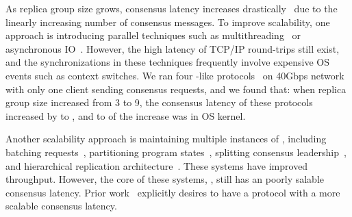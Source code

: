 
As replica group size grows, \paxos consensus latency increases
drastically~\cite{scatter:sosp11} due to the linearly increasing number of 
consensus messages. To improve scalability,
one approach is introducing parallel techniques such as 
multithreading~\cite{zookeeper, spaxos:srds12} or asynchronous 
IO~\cite{crane:sosp15, libpaxos}. However, the high latency of TCP/IP 
round-trips still exist, and the synchronizations in these techniques
frequently involve expensive OS events such as context switches. We ran four
\paxos-like protocols~\cite{zookeeper, crane:sosp15, spaxos:srds12, libpaxos} on 
40Gbps network with only one client sending consensus requests, and we found 
that: when replica group size increased from 3 to 9, the consensus latency of 
these protocols increased by \tradlatencyincreaselow to 
\tradlatencyincreasehigh, and \systemcostlow to \systemcosthigh of the increase 
was in OS kernel.

Another scalability approach is maintaining multiple instances of \paxos, 
including batching requests~\cite{calvin:sigmod12}, partitioning program 
states~\cite{scatter:sosp11,ssmr:dsn14}, splitting consensus 
leadership~\cite{mencius:osdi08,spaxos:srds12}, and hierarchical 
replication architecture~\cite{manos:hotdep10,scatter:sosp11}. These systems 
have improved throughput. However, the core of these systems, \paxos, 
still has an poorly salable consensus latency. 
Prior work~\cite{ellis:thesis,scatter:sosp11,manos:hotdep10} explicitly desires 
to have a \paxos protocol with a more scalable consensus latency.





